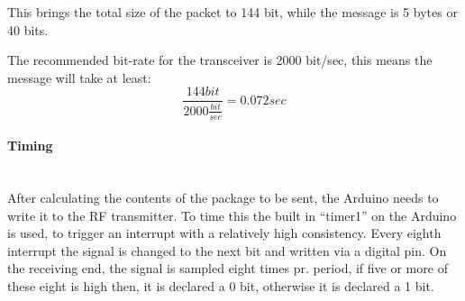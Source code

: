 \begin{table}[ht]
\centering
{}
\caption{A table view of the content of transmitting \enquote{Hello} with RadioHead.}
\label{table:RH}
\end{table}

This brings the total size of the packet to 144 bit, while the message is 5 bytes or 40 bits.

The recommended bit-rate for the transceiver is 2000 bit/sec, this means the message will take at least:
\begin{equation}
\frac{144 bit}{2000 \frac{bit}{sec}} = 0.072 sec
\end{equation}

\paragraph{Timing} \hfill \\
After calculating the contents of the package to be sent, the Arduino needs to write it to the RF transmitter. 
To time this the built in ``timer1'' on the Arduino is used, to trigger an interrupt with a relatively high consistency.
Every eighth interrupt the signal is changed to the next bit and written via a digital pin. 
On the receiving end, the signal is sampled eight times pr. period, if five or more of these eight is high then, it is declared a 0 bit, otherwise it is declared a 1 bit. %
